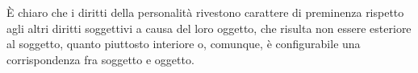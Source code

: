 È chiaro che i diritti della personalità rivestono carattere di preminenza rispetto agli altri diritti soggettivi a causa del loro oggetto, che risulta non essere esteriore al soggetto, quanto piuttosto interiore o, comunque, è configurabile una corrispondenza fra soggetto e oggetto.
